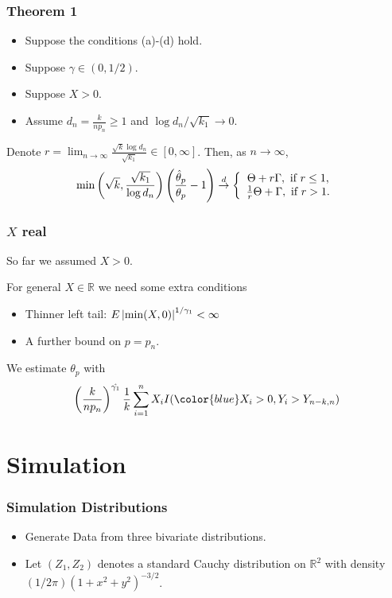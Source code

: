 \documentclass{beamer}
\begin{document}
\begin{frame}
    \frametitle{Theorem 1}

    \begin{itemize}
        \item Suppose the conditions (a)-(d) hold.
        \item Suppose $\gamma\in(0,1/2)$.
        \item  Suppose $X>0$.
        \item Assume $d_n = \frac{k}{np_n}\ge 1$ and $\log d_n/\sqrt{k_1}\to 0$.
      
    \end{itemize}
    Denote $r = \lim_{n\to \infty} \frac{\sqrt{k}\log d_n}{\sqrt{k_1}}\in [0,\infty]$. Then, as $n\to \infty$,
    $$
    \min\left(\sqrt{k},\frac{\sqrt{k_1}}{\log d_n}\right)\left(\frac{\hat{\theta}_p}{\theta_p}-1\right)\stackrel{d}{\to} \left\{
        \begin{array}{c}
            \Theta+r\Gamma, \ \text{if}\  r\le 1, \\
            \frac{1}{r}\Theta+\Gamma, \ \text{if} \ r>1.
        \end{array}
     \right.
    $$  

\end{frame}
\begin{frame}
    \frametitle{$X$ real}
    So far we assumed $X>0$.

    For general $X\in \mathbb{R}$ we need some extra conditions
\begin{itemize}
    \item Thinner left tail: $E\left\vert\min(X,0)\right\vert^{1/\gamma_1}<\infty$
    \item A further bound on $p=p_n$.
\end{itemize}
    
We estimate $\theta_p$ with 
$$
\suit{\frac{k}{np_n}}^{\hat{\gamma_1}}\frac{1}{k}\sum_{i=1}^n X_i I({\color{blue} X_i>0},Y_i>Y_{n-k,n})
$$

\end{frame}
\section{Simulation}

\begin{frame}
    \frametitle{Simulation Distributions}
\begin{itemize}
    \item Generate Data from three bivariate distributions.
    \bigskip
    \item     Let $(Z_1,Z_2)$ denotes a standard Cauchy distribution on $\mathbb{R}^2$ with density $(1/2\pi)(1+x^2+y^2)^{-3/2}$.
\end{itemize}

    

\end{frame}
\end{document}
